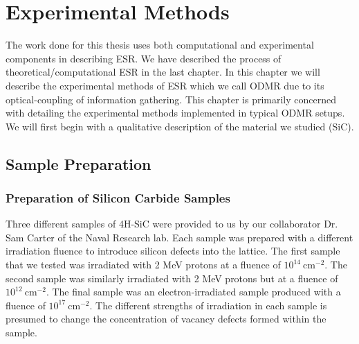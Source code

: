 \documentclass[oneside]{BYUPhys}
\begin{document}
\chapter{Experimental Methods}

The work done for this thesis uses both computational and experimental components in describing ESR. We have described the process of theoretical/computational ESR in the last chapter. In this chapter we will describe the experimental methods of ESR which we call ODMR due to its optical-coupling of information gathering. This chapter is primarily concerned with detailing the experimental methods implemented in typical ODMR setups. We will first begin with a qualitative description of the material we studied (SiC).

\section{Sample Preparation}

\subsection{Preparation of Silicon Carbide Samples}
\label{sec:SiCSamples}

Three different samples of 4H-SiC were provided to us by our collaborator Dr. Sam Carter of the Naval Research lab. Each sample was prepared with a different irradiation fluence to introduce silicon defects into the lattice. The first sample that we tested was irradiated with 2 MeV protons at a fluence of $10^{14}~\text{cm}^{-2}$. The second sample was similarly irradiated with 2 MeV protons but at a fluence of $10^{12}~\text{cm}^{-2}$. The final sample was an electron-irradiated sample produced with a fluence of $10^{17}~\text{cm}^{-2}$. The different strengths of irradiation in each sample is presumed to change the concentration of vacancy defects formed within the sample.
\end{document}
